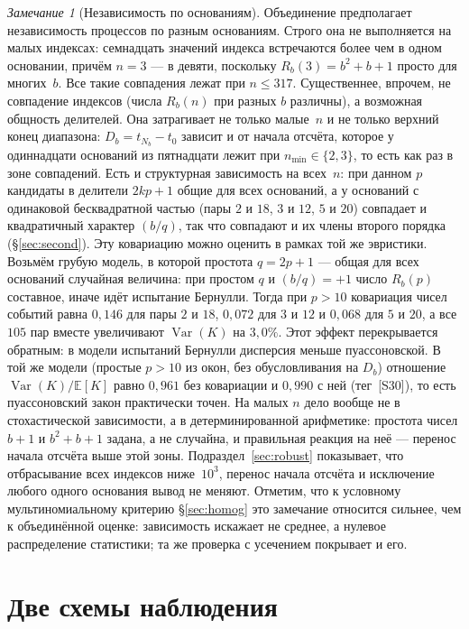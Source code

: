\documentclass[11pt,a4paper]{article}
\theoremstyle{plain}
\theoremstyle{remark}
\newtheorem{remark}{Замечание}
\newcommand{\Rb}{R_b}
\begin{document}
\begin{remark}[Независимость по основаниям]\label{rem:indep}
Объединение предполагает независимость процессов по разным основаниям. Строго она не
выполняется на малых индексах: семнадцать значений индекса встречаются более чем в одном
основании, причём $n=3$ --- в девяти, поскольку $\Rb(3)=b^2+b+1$ просто для многих~$b$.
Все такие совпадения лежат при $n\le317$. Существеннее, впрочем, не совпадение индексов
(числа $\Rb(n)$ при разных $b$ различны), а возможная общность делителей. Она
затрагивает не только малые~$n$ и не только верхний конец диапазона:
$D_b=t_{N_b}-t_0$ зависит и от начала отсчёта, которое у одиннадцати оснований из
пятнадцати лежит при $n_{\min}\in\{2,3\}$, то есть как раз в зоне совпадений.
Есть и структурная зависимость на всех~$n$: при данном $p$ кандидаты в делители
$2kp+1$ общие для всех оснований, а у оснований с одинаковой бесквадратной частью
(пары $2$ и $18$, $3$ и $12$, $5$ и $20$) совпадает и квадратичный характер
$(b/q)$, так что совпадают и их члены второго порядка
(\S\ref{sec:second}). Эту ковариацию можно оценить в рамках той же эвристики.
Возьмём грубую модель, в которой простота $q=2p+1$ --- общая для всех оснований
случайная величина: при простом $q$ и $(b/q)=+1$ число $\Rb(p)$ составное, иначе
идёт испытание Бернулли. Тогда при $p>10$ ковариация чисел событий равна
$0{,}146$ для пары $2$ и $18$, $0{,}072$ для $3$ и $12$ и $0{,}068$ для $5$ и $20$,
а все $105$ пар вместе увеличивают $\operatorname{Var}(K)$ на $3{,}0\%$. Этот эффект
перекрывается обратным: в модели испытаний Бернулли дисперсия меньше
пуассоновской. В той же модели (простые $p>10$ из окон, без обусловливания на
$D_b$) отношение $\operatorname{Var}(K)/\mathbb E[K]$ равно $0{,}961$ без ковариации
и $0{,}990$ с ней (тег~[S30]), то есть пуассоновский закон практически точен. На малых $n$ дело вообще не в стохастической зависимости, а в
детерминированной арифметике: простота чисел $b+1$ и $b^2+b+1$ задана, а не
случайна, и правильная реакция на неё --- перенос начала отсчёта выше этой зоны.
Подраздел~\ref{sec:robust} показывает, что отбрасывание всех индексов
ниже~$10^3$, перенос начала отсчёта и исключение любого одного основания вывод не
меняют. Отметим, что к условному мультиномиальному критерию
\S\ref{sec:homog} это замечание относится сильнее, чем к объединённой оценке:
зависимость искажает не среднее, а нулевое распределение статистики; та же
проверка с усечением покрывает и его.
\end{remark}

\section{Две схемы наблюдения}\label{sec:scheme}
\end{document}
